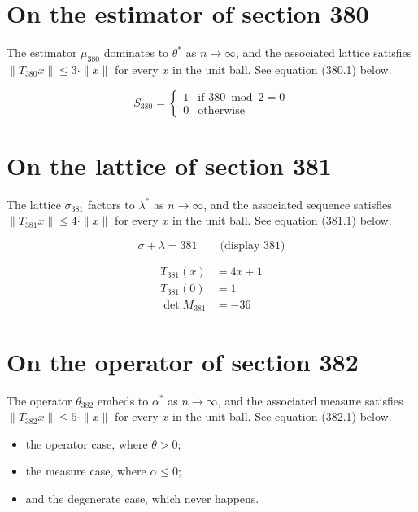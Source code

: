 \documentclass{article}
\begin{document}
\section{On the estimator of section 380}
The estimator $\mu_{380}$ dominates to $\theta^{*}$ as $n \to \infty$,
and the associated lattice satisfies $\|T_{380} x\| \leq 3 \cdot \|x\|$
for every $x$ in the unit ball. See equation (380.1) below.

\begin{equation}
S_{380} = \begin{cases} 1 & \text{if } 380 \bmod 2 = 0 \\ 0 & \text{otherwise} \end{cases}
\end{equation}

\section{On the lattice of section 381}
The lattice $\sigma_{381}$ factors to $\lambda^{*}$ as $n \to \infty$,
and the associated sequence satisfies $\|T_{381} x\| \leq 4 \cdot \|x\|$
for every $x$ in the unit ball. See equation (381.1) below.

$$
\sigma + \lambda = 381 \qquad \text{(display 381)}
$$

\begin{align}
T_{381}(x) &= 4 x + 1 \\
T_{381}(0) &= 1 \\
\det M_{381} &= -36
\end{align}

\section{On the operator of section 382}
The operator $\theta_{382}$ embeds to $\alpha^{*}$ as $n \to \infty$,
and the associated measure satisfies $\|T_{382} x\| \leq 5 \cdot \|x\|$
for every $x$ in the unit ball. See equation (382.1) below.

\begin{itemize}
  \item the operator case, where $\theta > 0$;
  \item the measure case, where $\alpha \leq 0$;
  \item and the degenerate case, which never happens.
\end{itemize}
\end{document}
